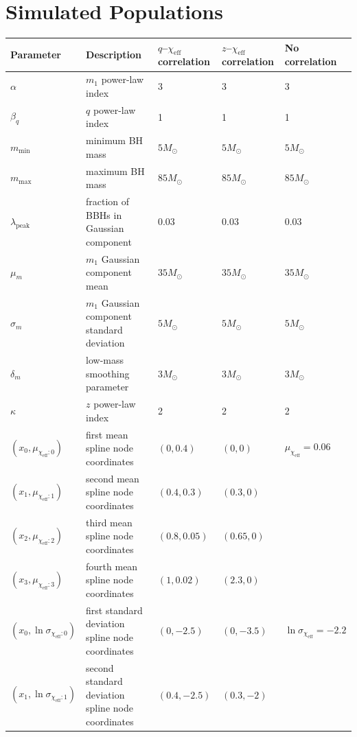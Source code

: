 \documentclass[%
reprint,
 amsmath,amssymb,
 aps,
 prd,nofootinbib,nobibnotes,
 superscriptaddress,groupedaddress,
]{revtex4-2}
\begin{document}
\section{Simulated Populations}
\label{sec: simulated populations}

\begin{table}
\renewcommand{\arraystretch}{1.25}
\centering
\begin{tabular}{lllll}
\hline\hline
Parameter & Description & $q$--$\chi_\mathrm{eff}$ correlation & $z$--$\chi_\mathrm{eff}$ correlation & No correlation \\
\hline $\alpha$ & $m_1$ power-law index & $3$ & $3$ & $3$ \\
$\beta_q$ & $q$ power-law index & 1 & 1 & 1 \\
$m_\mathrm{min}$ & minimum BH mass & $5M_\odot$ & $5M_\odot$ & $5 M_\odot$ \\
$m_\mathrm{max}$ & maximum BH mass & $85M_\odot$ & $85M_\odot$ & $85 M_\odot$ \\
$\lambda_\mathrm{peak}$ & fraction of BBHs in Gaussian component & $0.03$ & $0.03$ & $0.03$ \\
$\mu_m$ & $m_1$ Gaussian component mean & $35M_\odot$ & $35 M_\odot$ & $35 M_\odot$ \\
$\sigma_m$ & $m_1$ Gaussian component standard deviation  & $5M_\odot$ & $5M_\odot$ & $5M_\odot$ \\
$\delta_m$ & low-mass smoothing parameter & $3M_\odot$ & $3M_\odot$ & $3M_\odot$ \\
\hline
$\kappa$ & $z$ power-law index & 2 & 2 & 2 \\ \hline
$(x_0, \mu_{\chi_\mathrm{eff}:0})$ & first mean spline node coordinates & $(0, 0.4)$ & $(0, 0)$ & $\mu_{\chi_\mathrm{eff}} = 0.06$ \\
$(x_1, \mu_{\chi_\mathrm{eff}:1})$ & second mean spline node coordinates & $(0.4, 0.3)$ & $(0.3, 0)$ & \\
$(x_2, \mu_{\chi_\mathrm{eff}:2})$ & third mean spline node coordinates & $(0.8, 0.05)$ &  $(0.65, 0)$ & \\
$(x_3, \mu_{\chi_\mathrm{eff}:3})$ & fourth mean spline node coordinates & $(1, 0.02)$ & $(2.3, 0)$ & \\
$(x_0, \ln\sigma_{\chi_\mathrm{eff}:0})$ & first standard deviation spline node coordinates & $(0, -2.5)$& $(0, -3.5)$  & $\ln\sigma_{\chi_\mathrm{eff}} = -2.2$ \\
$(x_1, \ln\sigma_{\chi_\mathrm{eff}:1})$ & second standard deviation spline node coordinates & $(0.4, -2.5)$ & $(0.3, -2)$ & \\

\end{tabular}
\end{table}
\end{document}
